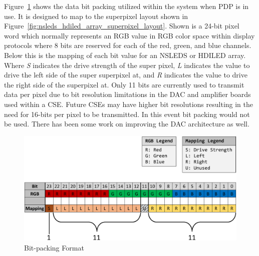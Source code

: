     Figure~\ref{fig:bit_packing} shows the data bit packing utilized within the system when PDP is in use. It is designed to map to the superpixel layout shown in Figure~\ref{fig:nsleds_hdiled_array_superpixel_layout}. Shown is a 24-bit pixel word which normally represents an RGB value in RGB color space within display protocols where 8 bits are reserved for each of the red, green, and blue channels. Below this is the mapping of each bit value for an NSLEDS or HDILED array. Where {\it S} indicates the drive strength of the super pixel, {\it L} indicates the value to drive the left side of the super superpixel at, and {\it R} indicates the value to drive the right side of the superpixel at. Only 11 bits are currently used to transmit data per pixel due to bit resolution limitations in the DAC and amplifier boards used within a CSE. Future CSEs may have higher bit resolutions resulting in the need for 16-bits per pixel to be transmitted. In this event bit packing would not be used. There has been some work on improving the DAC architecture as well\cite{EjzakEtAl2019}.

    \begin{figure}
        \centering
        \includegraphics[width=1.0\textwidth]{fig/bit_packing.pdf}
        \caption{Bit-packing Format}
        \label{fig:bit_packing}
    \end{figure}

